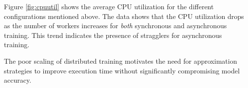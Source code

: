 Figure \ref{fig:cpuutil} shows the average CPU utilization for the 
different configurations mentioned above. The data shows that the 
CPU utilization drops as the number of workers increases for 
{\em both} synchronous and asynchronous training. This trend
indicates the presence of stragglers for asynchronous training.

The poor scaling of distributed training motivates the need for
approximation strategies to improve execution time without 
significantly compromising model accuracy.





